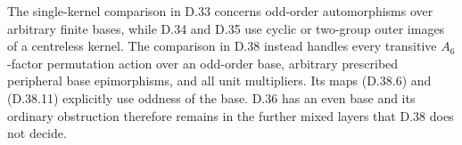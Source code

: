 The single-kernel comparison in D.33 concerns odd-order
automorphisms over arbitrary finite bases, while D.34 and
D.35 use cyclic or two-group outer images of a centreless
kernel.  The comparison in D.38 instead handles every
transitive \(A_6\)-factor permutation action over an
odd-order base, arbitrary prescribed peripheral base
epimorphisms, and all unit multipliers.  Its maps
\textup{(D.38.6)} and \textup{(D.38.11)} explicitly use
oddness of the base.  D.36 has an even base and its
ordinary obstruction therefore remains in the further
mixed layers that D.38 does not decide.
